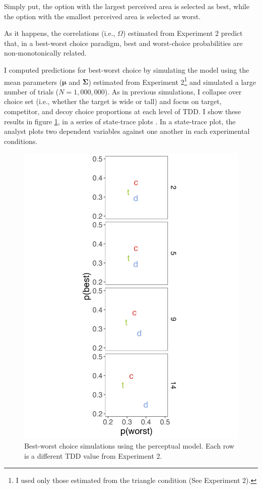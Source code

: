 Simply put, the option with the largest perceived area is selected as best, while the option with the smallest perceived area is selected as worst. 

As it happens, the correlations (i.e., $\Omega$) estimated from Experiment 2 predict that, in a best-worst choice paradigm, best and worst-choice probabilities are non-monotonically related. 

I computed predictions for best-worst choice by simulating the model using the mean parameters ($\boldsymbol{\mu}$ and $\boldsymbol{\Sigma}$) estimated from Experiment 2\footnote{I used only those estimated from the triangle condition (See Experiment 2).} and simulated a large number of trials ($N=1,000,000$). As in previous simulations, I collapse over choice set (i.e., whether the target is wide or tall) and focus on target, competitor, and decoy choice proportions at each level of TDD. I show these results in figure \ref{fig:bw_sim}, in a series of state-trace plots \parencite{bamber1979state,ashby2022state}. In a state-trace plot, the analyst plots two dependent variables against one another in each experimental conditions. 

\begin{figure}
   \includegraphics[width=\linewidth]{figures/bw_preds_sigma_constant_comp_effect_no_outliers.jpeg}
   \caption{Best-worst choice simulations using the perceptual model. Each row is a different TDD value from Experiment 2.}
   \label{fig:bw_sim}
\end{figure}

